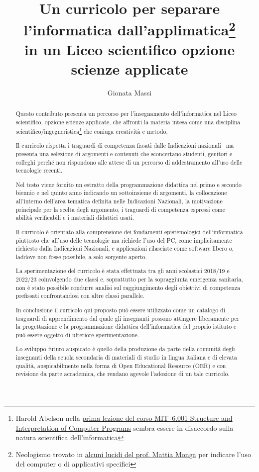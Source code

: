 \documentclass[a4paper]{easychair}
\title{Un curricolo per separare l'informatica dall'applimatica\thanks{Neologismo %
trovato in \href{https://aladdin.unimi.it/materiali/talk/2012_mirabilandia.pdf}%
{alcuni lucidi del prof. Mattia Monga} per indicare l'uso del computer o di applicativi specifici}\\ in un %
Liceo scientifico opzione scienze applicate}
\author{
Gionata Massi\institute{
  IIS Savoia Benincasa, Ancona (AN)
 }
}
\institute{
  IIS Savoia Benincasa, Ancona (AN)\\
  \email{gionata.massi@savoiabenincasa.it}
}
\begin{document}
\maketitle

\begin{abstract}
Questo contributo presenta un percorso per l'insegnamento dell'informatica
nel Liceo scientifico, opzione scienze applicate, che affronti la materia intesa come
una disciplina scientifico/ingegneristica\footnote{Harold Abelson nella
\href{https://youtu.be/-J_xL4IGhJA}{prima lezione del corso MIT~6.001
Structure and Interpretation of Computer Programs}
sembra essere in disaccordo sulla natura scientifica dell'informatica
} che coniuga creatività e metodo.

Il curricolo rispetta i traguardi di competenza fissati dalle Indicazioni
nazionali~\cite{IlMinistro2010}
ma presenta una selezione di argomenti e contenuti
che sconcertano studenti, genitori e colleghi perché non rispondono alle attese di un
percorso di addestramento all'uso delle tecnologie recenti.

Nel testo viene fornito un estratto della programmazione didattica nel primo e secondo biennio e nel quinto anno
indicando un sottoinsieme di argomenti,
la collocazione all'interno dell'area tematica definita nelle Indicazioni Nazionali,
la motivazione principale per la scelta degli argomento,
i traguardi di competenza espressi come abilità verificabili e i materiali didattici usati.

Il curricolo è orientato alla comprensione dei fondamenti epistemologici
dell'informatica piuttosto che all'uso delle tecnologie ma richiede l'uso del PC,
come implicitamente richiesto dalla Indicazioni Nazionali, e applicazioni rilasciate
come software libero o, laddove non fosse possibile, a solo sorgente aperto.

La sperimentazione del curricolo è stata effettuata tra gli anni scolastici
2018/19 e 2022/23 coinvolgendo due classi e, soprattutto per la sopraggiunta
emergenza sanitaria, non è stato possibile condurre analisi
sul raggiungimento degli obiettivi di competenza prefissati confrontandosi con altre
classi parallele.

In conclusione il curricolo qui proposto può essere utilizzato come un
catalogo di traguardi di apprendimento dal quale gli insegnanti possono attingere liberamente
per la progettazione e la programmazione didattica dell'informatica %
del proprio istituto e può essere oggetto di ulteriore sperimentazione.

Lo sviluppo futuro auspicato è quello della produzione da parte della comunità degli insegnanti
della scuola secondaria di materiali di studio in lingua italiana e di elevata qualità,
auspicabilmente nella forma di Open Educational Resource (OER) e con revisione da parte accademica,
che rendano agevole l'adozione di un tale curricolo.
\end{abstract}
\end{document}
